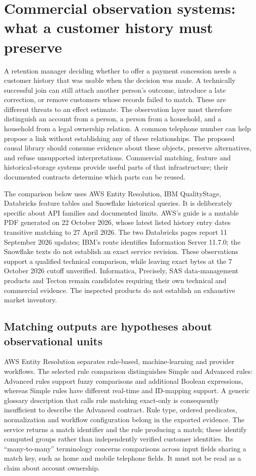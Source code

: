\section{Commercial observation systems: what a customer history must preserve}
\label{exec22:obs-scope}

A retention manager deciding whether to offer a payment concession needs a customer
history that was usable when the decision was made. A technically successful join
can still attach another person's outcome, introduce a late correction, or remove
customers whose records failed to match. These are different threats to an effect
estimate. The observation layer must therefore distinguish an account from a
person, a person from a household, and a household from a legal ownership relation.
A common telephone number can help propose a link without establishing any of
these relationships. The proposed causal library should consume evidence about
these objects, preserve alternatives, and refuse unsupported interpretations.
Commercial matching, feature and historical-storage systems provide useful parts
of that infrastructure; their documented contracts determine which parts can be
reused.

The comparison below uses AWS Entity Resolution, IBM QualityStage, Databricks
feature tables and Snowflake historical queries. It is deliberately specific about
API families and documented limits. AWS's guide is a mutable PDF generated on
22 October 2026, whose latest listed history entry dates transitive matching to
27 April 2026. The two Databricks pages report 11 September 2026 updates; IBM's
route identifies Information Server 11.7.0; the Snowflake texts do not establish an
exact service revision. These observations support a qualified technical
comparison, while leaving exact bytes at the 7 October 2026 cutoff unverified.
Informatica, Precisely, SAS data-management products and Tecton remain candidates
requiring their own technical and commercial evidence. The inspected products do
not establish an exhaustive market inventory.

\subsection{Matching outputs are hypotheses about observational units}
\label{exec22:obs-linkage}

AWS Entity Resolution separates rule-based, machine-learning and provider
workflows. The selected rule comparison distinguishes Simple and Advanced rules:
Advanced rules support fuzzy comparisons and additional Boolean expressions,
whereas Simple rules have different real-time and ID-mapping support. A generic
glossary description that calls rule matching exact-only is consequently
insufficient to describe the Advanced contract. Rule type, ordered predicates,
normalization and workflow configuration belong in the exported evidence.
The service returns a match identifier and the rule producing a match; these
identify computed groups rather than independently verified customer identities.
Its ``many-to-many'' terminology concerns comparisons across input fields sharing
a match key, such as home and mobile telephone fields. It must not be read as a
claim about account ownership.\cite{exec22_obs_aws_er_manual}

